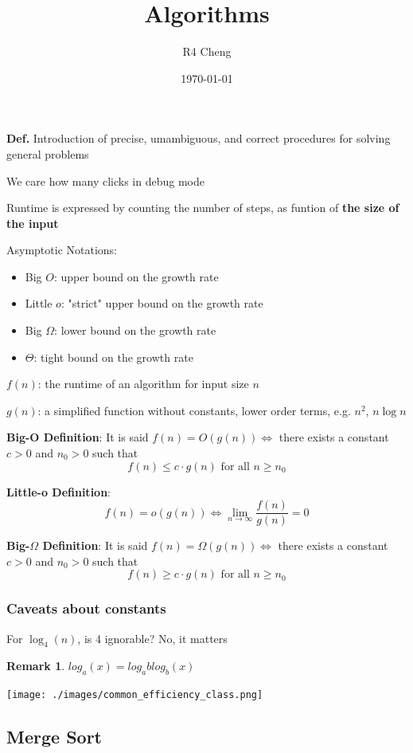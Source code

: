 \documentclass[12pt,a4paper]{article}
\title{Algorithms}
\author{R4 Cheng}
\date{\today}
\newtheorem*{rem}{Remark}
\newcommand{\Remark}[1]{
  \begin{rem}
    \color{cyan}
    #1
  \end{rem}
}
\begin{document}
\maketitle

\textbf{Def.} Introduction of precise, umambiguous, and correct procedures for solving general problems

We care how many clicks in debug mode

Runtime is expressed by counting the number of steps, as funtion of \textbf{the size of the input}

Asymptotic Notations:

\begin{itemize}
  \item Big $O$: upper bound on the growth rate
  \item Little $o$: "strict" upper bound on the growth rate
  \item Big $\Omega$: lower bound on the growth rate
  \item $\Theta$: tight bound on the growth rate
\end{itemize}

$f(n)$: the runtime of an algorithm for input size $n$

$g(n)$: a simplified function without constants, lower order terms, e.g. $n^2$, $n \log n$

\textbf{Big-O Definition}: It is said $f(n) = O(g(n)) \iff$ there exists a constant $c > 0$ and $n_0 > 0$ such that
$$f(n) \leq c \cdot g(n) \text{ for all } n \geq n_0$$

\textbf{Little-o Definition}:
$$f(n) = o(g(n)) \iff \lim_{n \to \infty} \frac{f(n)}{g(n)} = 0$$

\textbf{Big-$\Omega$ Definition}: It is said $f(n) = \Omega(g(n)) \iff$ there exists a constant $c > 0$ and $n_0 > 0$ such that
$$f(n) \geq c \cdot g(n) \text{ for all } n \geq n_0$$

\subsubsection*{Caveats about constants}

For $\log_4(n)$, is 4 ignorable? No, it matters

\Remark{$log_a(x) = log_a blog_b(x)$}

\texttt{[image: ./images/common\_efficiency\_class.png]}

\subsection*{Merge Sort}
\end{document}

